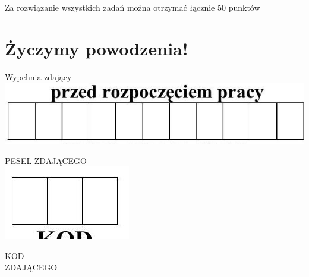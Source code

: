 \documentclass[10pt]{article}
\begin{document}
Za rozwiązanie wszystkich zadań można otrzymać łącznie 50 punktów

\section*{Życzymy powodzenia!}
Wypehnia zdający\\
\includegraphics[max width=\textwidth, center]{2024_11_21_2f72fc0c2faed8928619g-01}

PESEL ZDAJĄCEGO\\
\includegraphics[max width=\textwidth, center]{2024_11_21_2f72fc0c2faed8928619g-01(2)}

KOD\\
ZDAJĄCEGO
\end{document}
